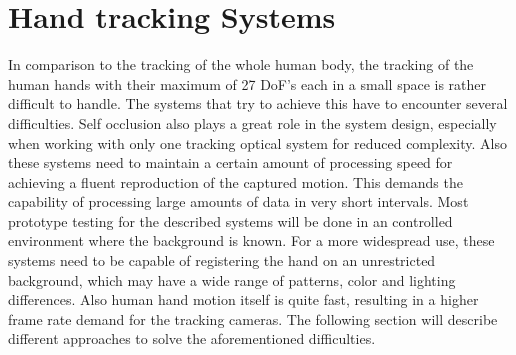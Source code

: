 \section{Hand tracking Systems}
\label{hand-tracking_systems}
In comparison to the tracking of the whole human body, the tracking of the human hands with their maximum of 27 DoF's each in a small space is rather difficult to handle.
The systems that try to achieve this have to encounter several difficulties. Self occlusion also plays a great role in the system design, especially when working with only one tracking optical system for reduced complexity. Also these systems need to maintain a certain amount of processing speed for achieving a fluent reproduction of the captured motion. This demands the capability of processing large amounts of data in very short intervals. Most prototype testing for the described systems will be done in an controlled environment where the background is known. For a more widespread use, these systems need to be capable of registering the hand on an unrestricted background, which may have a wide range of patterns, color and lighting differences. Also human hand motion itself is quite fast, resulting in a higher frame rate demand for the tracking cameras.
The following section will describe different approaches to solve the aforementioned difficulties.

